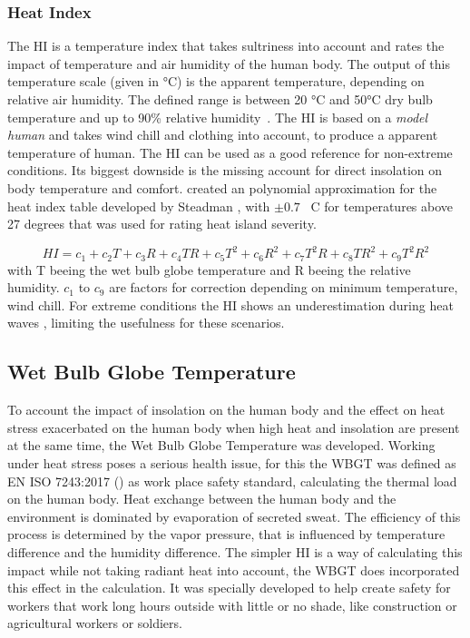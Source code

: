 \documentclass[12pt,a4paper, english,twoside]{article}
\begin{document}
    \subsubsection{Heat Index}\label{sec:heatIndex}
    The \gls{HI} is a temperature index that takes sultriness into account and rates the impact of temperature and air humidity of the human body. 
    The output of this temperature scale (given in °C) is the apparent temperature, depending on relative air humidity. 
    The defined range is between 20 °C and 50°C dry bulb temperature and up to 90\% relative humidity~\autocite[p. 862]{Steadman1979}. 
    The \gls{HI} is based on a \textit{model human} and takes wind chill and clothing into account, to produce a apparent temperature of human. 
    The \gls{HI} can be used as a good reference for non-extreme conditions. 
    Its biggest downside is the missing account for direct insolation on body temperature and comfort.
    \Cite{Schoen2005} created an polynomial approximation for the heat index table developed by Steadman \autocite{Steadman1979}, with $\pm 0.7$ \textdegree\ C for temperatures above 27 degrees that was used for rating heat island severity.

    \begin{equation}
      HI = c_1 + c_2 T + c_3 R + c_4 T R + c_5 T^2 + c_6 R^2 + c_7 T^2 R + c_8 T R^2 + c_9 T^2 R^2
    \end{equation}
    with T beeing the wet bulb globe temperature and R beeing the relative humidity. 
    $c_1$ to $c_9$ are factors for correction depending on minimum temperature, wind chill.
    For extreme conditions the \gls{HI} shows an underestimation during heat waves \autocite{Romps2022}, limiting the usefulness for these scenarios.
  \subsection{Wet Bulb Globe Temperature}
    To account the impact of insolation on the human body and the effect on heat stress exacerbated on the human body when high heat and insolation are present at the same time, the Wet Bulb Globe Temperature was developed. 
    Working under heat stress poses a serious health issue, for this the \gls{WBGT} was defined as EN ISO 7243:2017 (\cite{Iso7243_2017}) as work place safety standard, calculating the thermal load on the human body.
    Heat exchange between the human body and the environment is dominated by evaporation of secreted sweat.
    The efficiency of this process is determined by the vapor pressure, that is influenced by temperature difference and the humidity difference.
    The simpler \gls{HI} is a way of calculating this impact while not taking radiant heat into account, the WBGT does incorporated this effect in the calculation.
    It was specially developed to help create safety for workers that work long hours outside with little or no shade, like construction or agricultural workers or soldiers.
% 
% 
% 
% 
  \newpage
\end{document}
